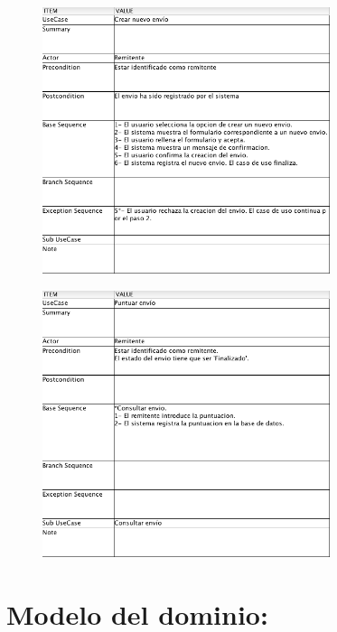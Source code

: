 \documentclass[10pt, a4paper,spanish]{article}
\begin{document}
		\begin{figure}[H]
			\centering
				\includegraphics[width=0.75\textwidth]{astah/use_case_crear_envio.png}
		\end{figure}

		\begin{figure}[H]
			\centering
				\includegraphics[width=0.75\textwidth]{astah/use_case_puntuar.png}
		\end{figure}

	\section{Modelo del dominio:}
\end{document}
